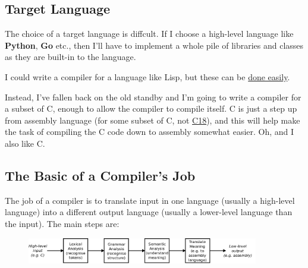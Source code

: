 \documentclass[journal, onecolumn, 12pt]{IEEEtran}
\begin{document}
\subsection{Target Language}

The choice of a target language is diffcult. If I choose a high-level language like \textbf{Python}, \textbf{Go} etc., then I'll have to implement a whole pile of libraries and classes as they are built-in to the language.

I could write a compiler for a language like Lisp, but these can be \href{ftp://publications.ai.mit.edu/ai-publications/pdf/AIM-039.pdf}{done easily}.

Instead, I've fallen back on the old standby and I'm going to write a compiler for a subset of C, enough to allow the compiler to compile itself. C is just a step up from assembly language (for some subset of C, not \href{https://en.wikipedia.org/wiki/C18_(C_standard_revision)}{C18}), and this will help make the task of compiling the C code down to assembly somewhat easier. Oh, and I also like C.

\subsection{The Basic of a Compiler's Job}

The job of a compiler is to translate input in one language (usually a high-level language) into a different output language (usually a lower-level language than the input). The main steps are:

\begin{figure}[!ht]
    \centering
    \includegraphics[width= 0.9\textwidth]{parsing_steps.png}
\end{figure}
\end{document}
